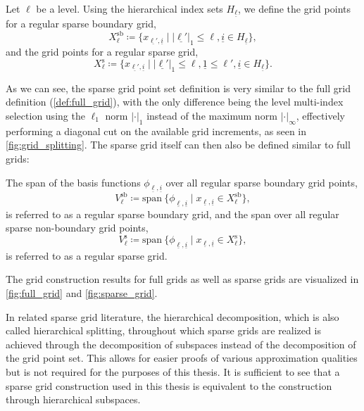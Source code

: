 \documentclass[
  a4paper,  %
  twoside,  %
  bibliography=totoc,
  headsepline,
  cleardoublepage=empty,
  parskip=half,
  draft=false
]{scrbook}
\begin{document}
\begin{definition}
Let $\ell$ be a level. Using the hierarchical index sets $H_{\underline{\ell}}$, we define the grid points for a regular sparse boundary grid,
\begin{equation}
X^{\mathrm{sb}}_{\ell} \coloneqq \{x_{\underline{\ell'},\underline{i}} \mid |\underline{\ell'}|_1 \leq \ell, \underline{i} \in H_{\underline{\ell}}\},
\end{equation}
and the grid points for a regular sparse grid,
\begin{equation}
X^{\mathrm{s}}_{\ell} \coloneqq \{x_{\underline{\ell'},\underline{i}} \mid |\underline{\ell'}|_1 \leq \ell, \underline{1} \leq \ell', \underline{i} \in H_{\underline{\ell}}\}.
\end{equation}
\end{definition}
%
As we can see, the sparse grid point set definition is very similar to the full grid definition (\cref{def:full_grid}), with the only difference being the level multi-index selection using the $\ell_1$ norm ${|\cdot|}_1$ instead of the maximum norm $|\cdot|_\infty$, effectively performing a diagonal cut on the available grid increments, as seen in \cref{fig:grid_splitting}.
The sparse grid itself can then also be defined similar to full grids:
\begin{definition}
The span of the basis functions $\phi_{\underline{\ell},\underline{i}}$ over all regular sparse boundary grid points,
\begin{equation}
V^{\mathrm{sb}}_{\ell} \coloneqq \mathrm{span}~ \{\phi_{\underline{\ell},\underline{i}} \mid x_{\underline{\ell},\underline{i}} \in X^{\mathrm{sb}}_{\ell}\},
\end{equation}
is referred to as a regular sparse boundary grid, and the span over all regular sparse non-boundary grid points,
\begin{equation}
V^{\mathrm{s}}_{\ell} \coloneqq \mathrm{span}~ \{\phi_{\underline{\ell},\underline{i}} \mid x_{\underline{\ell},\underline{i}} \in X^{\mathrm{s}}_{\ell}\},
\label{eq:sparse_grid}
\end{equation}
is referred to as a regular sparse grid.
\label{def:sparse_grid}
\end{definition}
%
The grid construction results for full grids as well as sparse grids are visualized in \cref{fig:full_grid} and \cref{fig:sparse_grid}.

In related sparse grid literature, the hierarchical decomposition, which is also called hierarchical splitting, throughout which sparse grids are realized is achieved through the decomposition of subspaces instead of the decomposition of the grid point set.
This allows for easier proofs of various approximation qualities but is not required for the purposes of this thesis.
It is sufficient to see that a sparse grid construction used in this thesis is equivalent to the construction through hierarchical subspaces.
\end{document}

